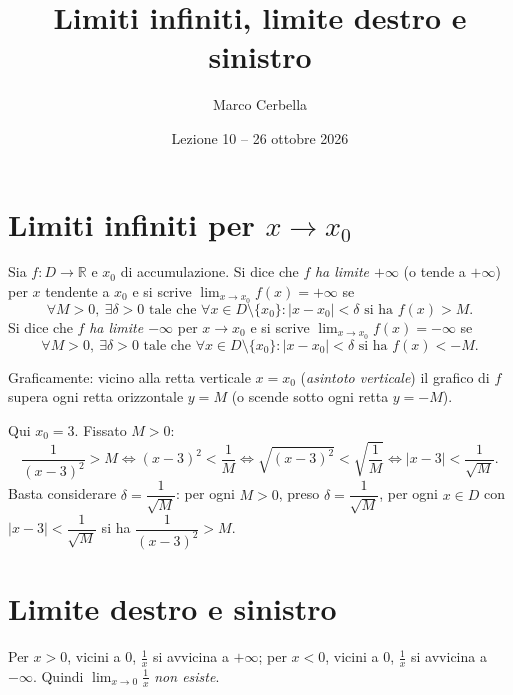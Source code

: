 \documentclass[11pt,a4paper]{article}
\title{Limiti infiniti, limite destro e sinistro}
\author{Marco Cerbella}
\date{Lezione 10 -- 26 ottobre 2026}
\begin{document}
\maketitle

\section{Limiti infiniti per $x \to x_0$}

\begin{definizione}
Sia $f : D \to \mathbb{R}$ e $x_0$ di accumulazione. Si dice che $f$ \emph{ha limite $+\infty$} (o tende a $+\infty$) per $x$ tendente a $x_0$ e si scrive $\displaystyle\lim_{x\to x_0} f(x) = +\infty$ se
\[
\forall M > 0,\ \exists \delta > 0 \text{ tale che } \forall x \in D \setminus \{x_0\} : |x - x_0| < \delta \text{ si ha } f(x) > M .
\]
Si dice che $f$ \emph{ha limite $-\infty$} per $x \to x_0$ e si scrive $\displaystyle\lim_{x\to x_0} f(x) = -\infty$ se
\[
\forall M > 0,\ \exists \delta > 0 \text{ tale che } \forall x \in D \setminus \{x_0\} : |x - x_0| < \delta \text{ si ha } f(x) < -M .
\]
\end{definizione}

Graficamente: vicino alla retta verticale $x = x_0$ (\emph{asintoto verticale}) il grafico di $f$ supera ogni retta orizzontale $y = M$ (o scende sotto ogni retta $y = -M$).

\begin{esempio}[$\lim_{x\to 3}\frac{1}{(x-3)^2} = +\infty$]
Qui $x_0 = 3$. Fissato $M > 0$:
\[
\frac{1}{(x-3)^2} > M \iff (x-3)^2 < \frac{1}{M} \iff \sqrt{(x-3)^2} < \sqrt{\frac{1}{M}} \iff |x - 3| < \frac{1}{\sqrt{M}} .
\]
Basta considerare $\delta = \dfrac{1}{\sqrt{M}}$: per ogni $M > 0$, preso $\delta = \dfrac{1}{\sqrt M}$, per ogni $x \in D$ con $|x - 3| < \dfrac{1}{\sqrt M}$ si ha $\dfrac{1}{(x-3)^2} > M$.
\end{esempio}

\section{Limite destro e sinistro}

\begin{esempio}[$f(x) = \frac{1}{x}$ non ha limite per $x \to 0$]
Per $x > 0$, vicini a $0$, $\frac{1}{x}$ si avvicina a $+\infty$; per $x < 0$, vicini a $0$, $\frac{1}{x}$ si avvicina a $-\infty$. Quindi $\displaystyle\lim_{x\to 0}\frac{1}{x}$ \emph{non esiste}.
\end{esempio}
\end{document}
